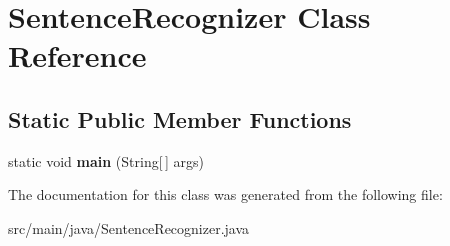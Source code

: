 \hypertarget{classSentenceRecognizer}{}\section{Sentence\+Recognizer Class Reference}
\label{classSentenceRecognizer}
\subsection*{Static Public Member Functions}
\begin{DoxyCompactItemize}
\item 
\mbox{\label{classSentenceRecognizer_abf5a7ec6990df7d565d5a818b797f756}} 
static void {\bfseries main} (String\mbox{[}$\,$\mbox{]} args)
\end{DoxyCompactItemize}


The documentation for this class was generated from the following file\+:\begin{DoxyCompactItemize}
\item 
src/main/java/Sentence\+Recognizer.\+java\end{DoxyCompactItemize}
